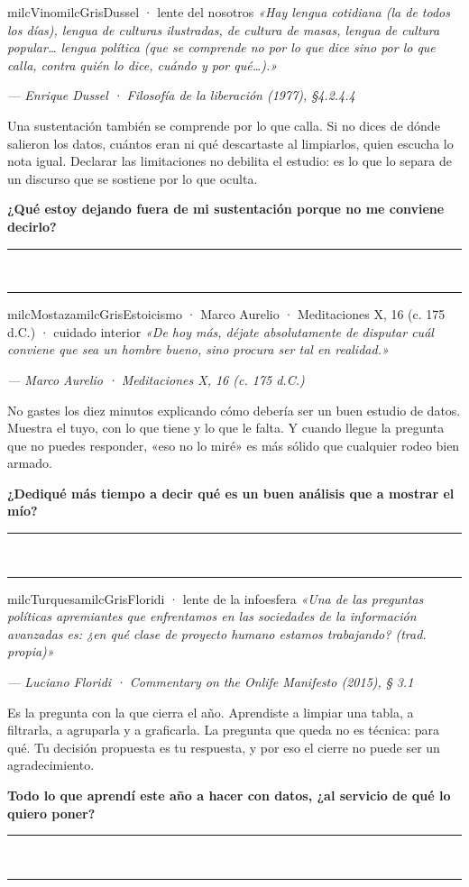 \documentclass[11pt,letterpaper]{article}
\newcommand{\linead}[1]{\noindent\color{milcLinea}\rule{#1}{0.5pt}\color{milcNegro}}
\begin{document}
\begin{softbox}{milcVino}{milcGris}{Dussel · lente del nosotros}
\textit{«Hay lengua cotidiana (la de todos los días), lengua de culturas ilustradas, de cultura de masas, lengua de cultura popular… lengua política (que se comprende no por lo que dice sino por lo que calla, contra quién lo dice, cuándo y por qué…).»}

{\footnotesize\itshape\color{milcNegro!70}--- Enrique Dussel · Filosofía de la liberación (1977), §4.2.4.4}

Una sustentación también se comprende por lo que calla. Si no dices de dónde salieron los datos, cuántos eran ni qué descartaste al limpiarlos, quien escucha lo nota igual. Declarar las limitaciones no debilita el estudio: es lo que lo separa de un discurso que se sostiene por lo que oculta.

\textbf{¿Qué estoy dejando fuera de mi sustentación porque no me conviene decirlo?}
\end{softbox}
\linead{\linewidth}\\[1mm]
\linead{\linewidth}

\begin{softbox}{milcMostaza}{milcGris}{Estoicismo · Marco Aurelio · Meditaciones X, 16 (c. 175 d.C.) · cuidado interior}
\textit{«De hoy más, déjate absolutamente de disputar cuál conviene que sea un hombre bueno, sino procura ser tal en realidad.»}

{\footnotesize\itshape\color{milcNegro!70}--- Marco Aurelio · Meditaciones X, 16 (c. 175 d.C.)}

No gastes los diez minutos explicando cómo debería ser un buen estudio de datos. Muestra el tuyo, con lo que tiene y lo que le falta. Y cuando llegue la pregunta que no puedes responder, «eso no lo miré» es más sólido que cualquier rodeo bien armado.

\textbf{¿Dediqué más tiempo a decir qué es un buen análisis que a mostrar el mío?}
\end{softbox}
\linead{\linewidth}\\[1mm]
\linead{\linewidth}

\begin{softbox}{milcTurquesa}{milcGris}{Floridi · lente de la infoesfera}
\textit{«Una de las preguntas políticas apremiantes que enfrentamos en las sociedades de la información avanzadas es: ¿en qué clase de proyecto humano estamos trabajando? (trad. propia)»}

{\footnotesize\itshape\color{milcNegro!70}--- Luciano Floridi · Commentary on the Onlife Manifesto (2015), § 3.1}

Es la pregunta con la que cierra el año. Aprendiste a limpiar una tabla, a filtrarla, a agruparla y a graficarla. La pregunta que queda no es técnica: para qué. Tu decisión propuesta es tu respuesta, y por eso el cierre no puede ser un agradecimiento.

\textbf{Todo lo que aprendí este año a hacer con datos, ¿al servicio de qué lo quiero poner?}
\end{softbox}
\linead{\linewidth}\\[1mm]
\linead{\linewidth}
\end{document}
